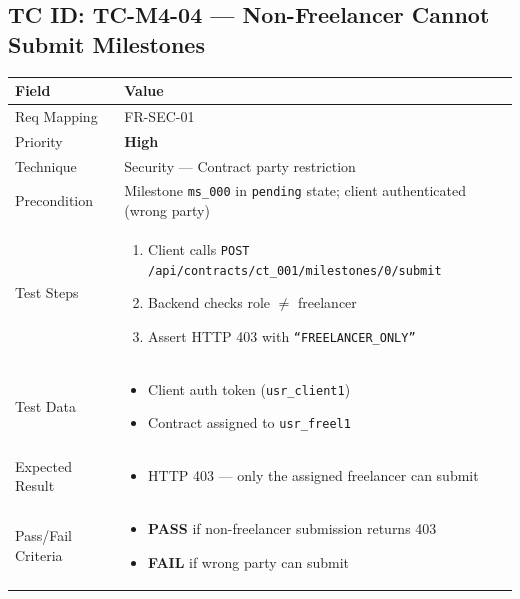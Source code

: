 \documentclass[12pt,a4paper]{article}
\newcommand{\sevhigh}{\textcolor{severityhigh}{\textbf{High}}}
\newcommand{\passresult}{\textcolor{passgreen}{\textbf{PASS}}}
\newcommand{\failresult}{\textcolor{failred}{\textbf{FAIL}}}
\begin{document}
\vspace{0.8cm}

\subsection{TC ID: TC-M4-04 --- Non-Freelancer Cannot Submit Milestones}

\begin{tabular}{|p{}|p{}|}
\hline
\rowcolor{lightblue} \textbf{Field} & \textbf{Value} \\
\hline
Req Mapping & FR-SEC-01 \\
\hline
Priority & \sevhigh \\
\hline
Technique & Security --- Contract party restriction \\
\hline
Precondition & Milestone \texttt{ms\_000} in \texttt{pending} state; client authenticated (wrong party) \\
\hline
Test Steps &
\begin{enumerate}[nosep, leftmargin=*]
  \item Client calls \texttt{POST /api/contracts/ct\_001/milestones/0/submit}
  \item Backend checks role $\neq$ freelancer
  \item Assert HTTP 403 with \texttt{``FREELANCER\_ONLY''}
\end{enumerate} \\
\hline
Test Data &
\begin{itemize}[nosep, leftmargin=*]
  \item Client auth token (\texttt{usr\_client1})
  \item Contract assigned to \texttt{usr\_freel1}
\end{itemize} \\
\hline
Expected Result &
\begin{itemize}[nosep, leftmargin=*]
  \item HTTP 403 --- only the assigned freelancer can submit
\end{itemize} \\
\hline
Pass/Fail Criteria &
\begin{itemize}[nosep, leftmargin=*]
  \item \passresult{} if non-freelancer submission returns 403
  \item \failresult{} if wrong party can submit
\end{itemize} \\
\hline
\end{tabular}
\end{document}
